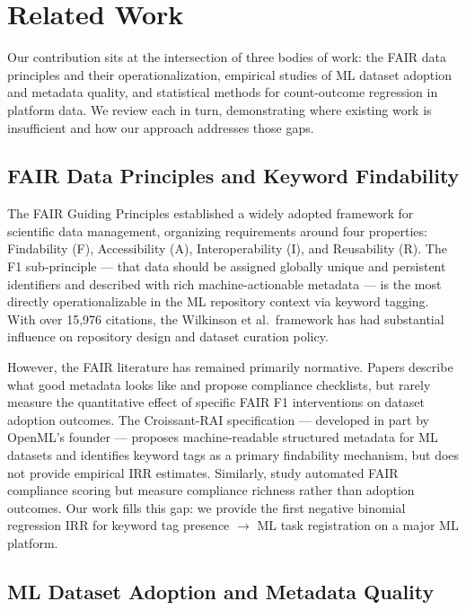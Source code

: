 \section{Related Work}
\label{sec:related}

Our contribution sits at the intersection of three bodies of work: the FAIR data principles and their operationalization, empirical studies of ML dataset adoption and metadata quality, and statistical methods for count-outcome regression in platform data. We review each in turn, demonstrating where existing work is insufficient and how our approach addresses those gaps.

\subsection{FAIR Data Principles and Keyword Findability}

The FAIR Guiding Principles \citep{Wilkinson2016FAIR} established a widely adopted framework for scientific data management, organizing requirements around four properties: Findability (F), Accessibility (A), Interoperability (I), and Reusability (R). The F1 sub-principle --- that data should be assigned globally unique and persistent identifiers and described with rich machine-actionable metadata --- is the most directly operationalizable in the ML repository context via keyword tagging. With over 15,976 citations, the Wilkinson et al.\ framework has had substantial influence on repository design and dataset curation policy.

However, the FAIR literature has remained primarily normative. Papers describe what good metadata looks like and propose compliance checklists, but rarely measure the quantitative effect of specific FAIR F1 interventions on dataset adoption outcomes. The Croissant-RAI specification \citep{Jain2024Croissant} --- developed in part by OpenML's founder --- proposes machine-readable structured metadata for ML datasets and identifies keyword tags as a primary findability mechanism, but does not provide empirical IRR estimates. Similarly, \citet{Trisovic2025FAIR} study automated FAIR compliance scoring but measure compliance richness rather than adoption outcomes. Our work fills this gap: we provide the first negative binomial regression IRR for keyword tag presence $\rightarrow$ ML task registration on a major ML platform.

\subsection{ML Dataset Adoption and Metadata Quality}

